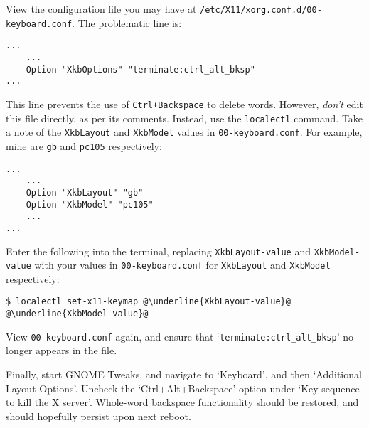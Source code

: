 \documentclass[a4paper]{article}
\begin{document}
View the configuration file you may have at \lstinline|/etc/X11/xorg.conf.d/00-keyboard.conf|.
The problematic line is:
\begin{lstlisting}
...
    ...
    Option "XkbOptions" "terminate:ctrl_alt_bksp"
...
\end{lstlisting}
This line prevents the use of \lstinline|Ctrl+Backspace| to delete words.
However, \emph{don't} edit this file directly, as per its comments.
Instead, use the \lstinline|localectl| command.
Take a note of the \lstinline|XkbLayout| and \lstinline|XkbModel| values in \lstinline|00-keyboard.conf|.
For example, mine are \lstinline|gb| and \lstinline|pc105| respectively:
\begin{lstlisting}
...
    ...
    Option "XkbLayout" "gb"
    Option "XkbModel" "pc105"
    ...
...
\end{lstlisting}
Enter the following into the terminal, replacing \lstinline|XkbLayout-value| and \lstinline|XkbModel-value| with your values in \lstinline|00-keyboard.conf| for \lstinline|XkbLayout| and \lstinline|XkbModel| respectively:
\begin{lstlisting}[escapechar=@]
$ localectl set-x11-keymap @\underline{XkbLayout-value}@ @\underline{XkbModel-value}@
\end{lstlisting}
View \lstinline|00-keyboard.conf| again, and ensure that `\lstinline|terminate:ctrl_alt_bksp|' no longer appears in the file.

Finally, start GNOME Tweaks, and navigate to `Keyboard', and then `Additional Layout Options'.
Uncheck the `Ctrl+Alt+Backspace' option under `Key sequence to kill the X server'.
Whole-word backspace functionality should be restored, and should hopefully persist upon next reboot.



\end{document}
